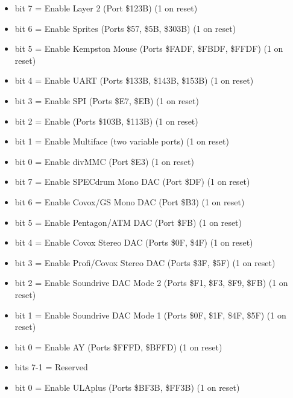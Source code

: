 \begin{itemize}
\item bit 7 = Enable Layer 2 (Port \$123B) (1 on reset)
\item bit 6 = Enable Sprites (Ports \$57, \$5B, \$303B) (1 on reset)
\item bit 5 = Enable Kempston Mouse (Ports \$FADF, \$FBDF, \$FFDF) (1
  on reset)
\item bit 4 = Enable UART (Ports \$133B, \$143B, \$153B) (1 on reset)
\item bit 3 = Enable SPI (Ports \$E7, \$EB) (1 on reset)
\item bit 2 = Enable \iic (Ports \$103B, \$113B) (1 on reset)
\item bit 1 = Enable Multiface (two variable ports) (1 on reset)
\item bit 0 = Enable divMMC (Port \$E3) (1 on reset)
\end{itemize}

\begin{itemize}
\item bit 7 = Enable SPECdrum Mono DAC (Port \$DF) (1 on reset)
\item bit 6 = Enable Covox/GS Mono DAC (Port \$B3) (1 on reset)
\item bit 5 = Enable Pentagon/ATM DAC (Port \$FB) (1 on reset)
\item bit 4 = Enable Covox Stereo DAC (Ports \$0F, \$4F) (1 on reset)
\item bit 3 = Enable Profi/Covox Stereo DAC (Ports \$3F, \$5F) (1 on
  reset)
\item bit 2 = Enable Soundrive DAC Mode 2 (Ports \$F1, \$F3, \$F9,
  \$FB) (1 on reset)
\item bit 1 = Enable Soundrive DAC Mode 1 (Ports \$0F, \$1F, \$4F,
  \$5F) (1 on reset)
\item bit 0 = Enable AY (Ports \$FFFD, \$BFFD) (1 on reset)
\end{itemize}

\begin{itemize}
\item bits 7-1 = Reserved
\item bit 0 = Enable ULAplus (Ports \$BF3B, \$FF3B) (1 on reset)
\end{itemize}

